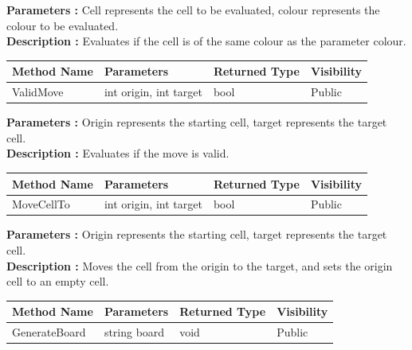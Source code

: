 \documentclass[12pt]{article}
\begin{document}
\textbf{Parameters :} Cell represents the cell to be evaluated, colour represents the colour to be evaluated. 
\\

\textbf{Description :} Evaluates if the cell is of the same colour as the parameter colour. 

\begin{table}[H]
    \begin{tabular}{|l|l|l|l|}
    \hline
    \rowcolor[HTML]{EFEFEF} 
    \cellcolor[HTML]{EFEFEF}\textbf{Method Name} & \textbf{Parameters}     & \textbf{Returned Type} & \textbf{Visibility} \\ \hline
    ValidMove                                   & int origin, int target   & bool                   & Public              \\ \hline
    \end{tabular}
\end{table}

\textbf{Parameters :} Origin represents the starting cell, target represents the target cell.  
\\

\textbf{Description :} Evaluates if the move is valid.

\begin{table}[H]
    \begin{tabular}{|l|l|l|l|}
    \hline
    \rowcolor[HTML]{EFEFEF} 
    \cellcolor[HTML]{EFEFEF}\textbf{Method Name} & \textbf{Parameters}     & \textbf{Returned Type} & \textbf{Visibility} \\ \hline
    MoveCellTo                                   & int origin, int target  & bool                   & Public              \\ \hline
    \end{tabular}
\end{table}

\textbf{Parameters :} Origin represents the starting cell, target represents the target cell. 
\\

\textbf{Description :} Moves the cell from the origin to the target, and sets the origin cell to an empty cell. 

\begin{table}[H]
    \begin{tabular}{|l|l|l|l|}
    \hline
    \rowcolor[HTML]{EFEFEF} 
    \cellcolor[HTML]{EFEFEF}\textbf{Method Name} & \textbf{Parameters}     & \textbf{Returned Type} & \textbf{Visibility} \\ \hline
    GenerateBoard                              & string board            & void                   & Public              \\ \hline
    \end{tabular}
\end{table}
\end{document}
